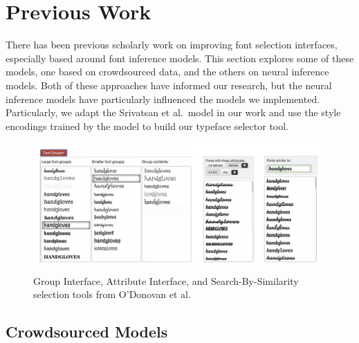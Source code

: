 \section{Previous Work}

There has been previous scholarly work on improving font selection interfaces, especially based around font inference models. This section explores some of these models, one based on crowdsourced data, and the others on neural inference models. Both of these approaches have informed our research, but the neural inference models have particularly influenced the models we implemented. Particularly, we adapt the Srivatsan et al.\ model \cite{srivatsan2020} in our work and use the style encodings trained by the model to build our typeface selector tool.

\begin{figure}
    \centering
    \includegraphics[width=1\textwidth]{images/odonovan-interfaces.png}
    \caption{Group Interface, Attribute Interface, and Search-By-Similarity selection tools from O'Donovan et al.\ \cite{odonovan2014}}
    \label{fig:odonovan-interfaces}
\end{figure}

\subsection{Crowdsourced Models}

